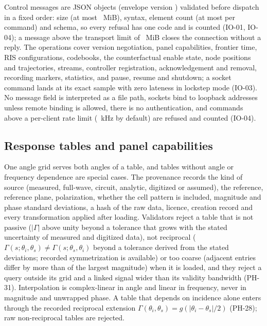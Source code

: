 Control messages are JSON objects (envelope version \numSchemaVersion)
validated before dispatch in a fixed order: size (at most \numMaxMessageMiB~MiB), syntax,
element count (at most \numMaxElements{} per command) and schema, so every refusal has one
code and is counted (IO-01, IO-04); a message above the transport limit of
\numHardMessageMiB~MiB closes the connection without a reply. The operations cover version negotiation, panel
capabilities, frontier time, RIS configurations, codebooks, the counterfactual enable state,
node positions and trajectories, streams, controller registration, acknowledgement and
removal, recording markers, statistics, and pause, resume and shutdown; a socket command
lands at its exact sample with zero lateness in lockstep mode (IO-03).
No message field is interpreted as a file path, sockets bind to loopback
addresses unless remote binding is allowed, there is no authentication, and commands above a
per-client rate limit (\numMaxCmdRateKHz~kHz by default) are refused and counted (IO-04).

\subsection{Response tables and panel capabilities}
One angle grid serves both angles of a table, and tables without angle or
frequency dependence are special cases. The provenance records the kind of source (measured,
full-wave, circuit, analytic, digitized or assumed), the reference, reference plane,
polarization, whether the cell pattern is included, magnitude and phase standard deviations,
a hash of the raw data, licence, creation record and every transformation applied after
loading.
Validators reject a table that is not passive ($|\Gamma|$ above unity
beyond a tolerance that grows with the stated uncertainty of measured and digitized data), not
reciprocal ($\Gamma(s;\theta_i,\theta_s)\neq\Gamma(s;\theta_s,\theta_i)$ beyond a tolerance
derived from the stated deviations; recorded symmetrization is available) or too coarse
(adjacent entries differ by more than \numDensityMax{} of the largest magnitude) when it is
loaded, and they reject a query outside its grid and a linked signal wider than its validity
bandwidth (PH-31). Interpolation is complex-linear in angle and linear in frequency, never in
magnitude and unwrapped phase. A table that depends on incidence alone enters through the
recorded reciprocal extension $\Gamma(\theta_i,\theta_s)=g(|\theta_i-\theta_s|/2)$ (PH-28);
raw non-reciprocal tables are rejected.

